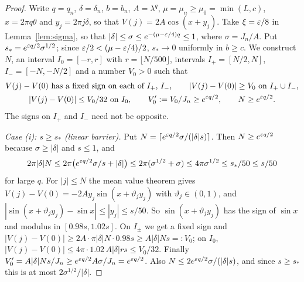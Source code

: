\begin{proof}
Write $q=q_n$, $\delta=\delta_n$, $b=b_n$, $A=\lambda^q$, $\mu=\mu_n\ge\mu_0=\min(L,c)$, $x=2\pi q\theta$ and $y_j=2\pi j\delta$, so that $V(j)=2A\cos(x+y_j)$. Take $\xi=\varepsilon/8$ in Lemma~\ref{lem:sigma}, so that $|\delta|\le\sigma\le e^{-(\mu-\varepsilon/4)q}\le1$, where $\sigma=J_n/A$. Put $s_*=e^{\varepsilon q/2}\sigma^{1/2}$; since $\varepsilon/2<(\mu-\varepsilon/4)/2$, $s_*\to0$ uniformly in $b\ge c$. We construct $N$, an interval $I_0=[-r,r]$ with $r=\lfloor N/500\rfloor$, intervals $I_+=[N/2,N]$, $I_-=[-N,-N/2]$ and a number $V_0>0$ such that
\begin{equation}\label{eq:barriergeom}
\begin{gathered}
V(j)-V(0)\ \text{has a fixed sign on each of }I_+,\,I_-,\qquad |V(j)-V(0)|\ge V_0\ \text{on }I_+\cup I_-,\\
|V(j)-V(0)|\le V_0/32\ \text{on }I_0,\qquad V_0':=V_0/J_n\ge e^{\varepsilon q/2},\qquad N\ge e^{\varepsilon q/2}.
\end{gathered}
\end{equation}
The signs on $I_+$ and $I_-$ need not be opposite.

\emph{Case (i): $s\ge s_*$ (linear barrier).} Put $N=\lceil e^{\varepsilon q/2}\sigma/(|\delta|s)\rceil$. Then $N\ge e^{\varepsilon q/2}$ because $\sigma\ge|\delta|$ and $s\le1$, and
\[
2\pi|\delta|N\le2\pi\bigl(e^{\varepsilon q/2}\sigma/s+|\delta|\bigr)\le2\pi(\sigma^{1/2}+\sigma)\le4\pi\sigma^{1/2}\le s_*/50\le s/50
\]
for large $q$. For $|j|\le N$ the mean value theorem gives $V(j)-V(0)=-2Ay_j\sin(x+\vartheta_jy_j)$ with $\vartheta_j\in(0,1)$, and $|\sin(x+\vartheta_jy_j)-\sin x|\le|y_j|\le s/50$. So $\sin(x+\vartheta_jy_j)$ has the sign of $\sin x$ and modulus in $[0.98s,1.02s]$. On $I_\pm$ we get a fixed sign and $|V(j)-V(0)|\ge2A\cdot\pi|\delta|N\cdot0.98s\ge A|\delta|Ns=:V_0$; on $I_0$, $|V(j)-V(0)|\le4\pi\cdot1.02\,A|\delta|rs\le V_0/32$. Finally $V_0'=A|\delta|Ns/J_n\ge e^{\varepsilon q/2}A\sigma/J_n=e^{\varepsilon q/2}$. Also $N\le2e^{\varepsilon q/2}\sigma/(|\delta|s)$, and since $s\ge s_*$ this is at most $2\sigma^{1/2}/|\delta|$.


\end{proof}
